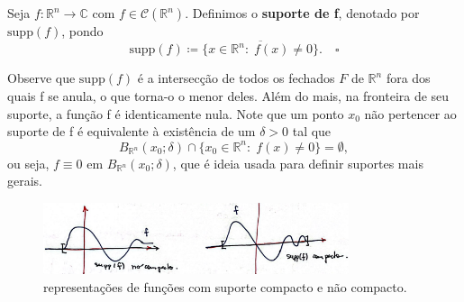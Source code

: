 \documentclass[../distribution_theory_notes.tex]{subfiles}
\begin{document}
\begin{def*}
  Seja \(f:\mathbb{R}^{n}\rightarrow \mathbb{C}\) com \(f\in \mathcal{C}(\mathbb{R}^{n})\). Definimos o \textbf{suporte de f}, denotado por \(\mathrm{supp}(f)\), pondo 
    \[
      \mathrm{supp}(f)\coloneqq \overline{\{x\in \mathbb{R}^{n}:\; f(x)\neq 0\}}. \quad \square
    \]
\end{def*}
  Observe que \(\mathrm{supp}(f)\) é a intersecção de todos os fechados \(F\) de \(\mathbb{R}^{n}\) fora dos quais f se anula, o que torna-o o menor deles. Além do mais, na fronteira de seu suporte, a função f é identicamente nula. Note que um ponto \(x_{0}\) não pertencer ao suporte de f é equivalente à existência de um \(\delta > 0\) tal que 
    \[
      B_{\mathbb{R}^{n}}(x_{0}; \delta )\cap \{x_{0}\in \mathbb{R}^{n}:\; f(x)\neq 0\}= \emptyset,
    \]
    ou seja, \(f\equiv 0\) em \(B_{\mathbb{R}^{n}}(x_{0}; \delta )\), que é ideia usada para definir suportes mais gerais.
   \begin{figure}[H]
   \begin{center}
   \includegraphics[height=0.8\textheight, width=0.8\textwidth, keepaspectratio]{./Images/support_types_04.png}
   \end{center}
   \caption{representações de funções com suporte compacto e não compacto.}
   \end{figure}
\end{document}
